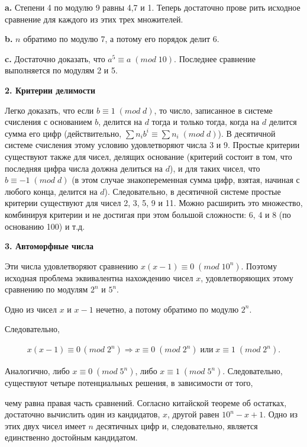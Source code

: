 \documentclass{mai_book}
\begin{document}
\medskip
\textbf{a.} Степени 4 по модулю 9 равны 4,7 и 1. Теперь достаточно прове­
рить исходное сравнение для каждого из этих трех множителей.

\medskip
\textbf{b.} $n$ обратимо по модулю 7, а потому его порядок делит 6.

\medskip
\textbf{c.} Достаточно доказать, что $a^5\equiv a\; (mod\;10)$. 
Последнее сравнение выполняется по модулям 2 и 5.

\bigskip
\noindent\textbf{2. Критерии делимости}

\medskip
Легко доказать, что если $b\equiv 1\; (mod\; d)$, то число, записанное в си­стеме счисления с основанием $b$, делится на $d$ тогда и только тогда,
когда на $d$ делится сумма его цифр (действительно, $\sum n_i b^i\equiv \sum n_i\; (mod\; d)$). В десятичной системе счисления этому условию удовлетво­ряют числа 3 и 9. Простые критерии существуют также для чисел, де­лящих основание (критерий состоит в том, что последняя цифра числа
должна делиться на $d$), и для таких чисел, что $b\equiv -1\; (mod\;d)$ (в этом случае знакопеременная сумма цифр, взятая, начиная с любого конца, делится на $d$). Следовательно, в десятичной системе простые критерии существуют для чисел 2, 3, 5, 9 и 11. Можно расширить это множество, комбинируя критерии и не достигая при этом большой сложности: 6, 4 и 8 (по основанию 100) и т.д.

\bigskip
\noindent\textbf{3. Автоморфные числа}

\medskip
Эти числа удовлетворяют сравнению $x(x-1)\equiv 0\;(mod\;10^n)$. Поэто­му исходная проблема эквивалентна нахождению чисел $x$, удовлетворя­ющих этому сравнению по модулям $2^n$ и $5^n$.

Одно из чисел $x$ и $x-1$ нечетно, а потому обратимо по модулю $2^n$.

\noindent Следовательно,


$$
\begin{aligned}
x(x-1)\equiv 0\, (mod\; 2^n)\Longrightarrow x\equiv 0\; (mod\; 2^n)\;  \text{или}\;  x\equiv 1\; (mod\;2^n).
\end{aligned}
$$


\medskip
\noindent Аналогично, либо $x\equiv0\;(mod\;5^n)$, либо $x\equiv 1\; (mod\; 5^n)$. Следовательно,
существуют четыре потенциальных решения, в зависимости от того,

\newpage


\noindent чему равна правая часть сравнений. Согласно китайской теореме об остатках, достаточно вычислить один из кандидатов, $x$, другой равен
$10^n-x+1$. Одно из этих двух чисел имеет $n$ десятичных цифр и,
следовательно, является единственно достойным кандидатом.
\end{document}
